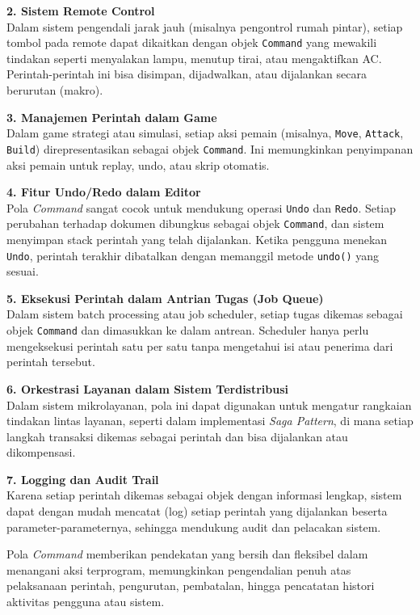 \textbf{2. Sistem Remote Control} \\
Dalam sistem pengendali jarak jauh (misalnya pengontrol rumah pintar), setiap tombol pada remote dapat dikaitkan dengan objek \texttt{Command} yang mewakili tindakan seperti menyalakan lampu, menutup tirai, atau mengaktifkan AC. Perintah-perintah ini bisa disimpan, dijadwalkan, atau dijalankan secara berurutan (makro).

\textbf{3. Manajemen Perintah dalam Game} \\
Dalam game strategi atau simulasi, setiap aksi pemain (misalnya, \texttt{Move}, \texttt{Attack}, \texttt{Build}) direpresentasikan sebagai objek \texttt{Command}. Ini memungkinkan penyimpanan aksi pemain untuk replay, undo, atau skrip otomatis.

\textbf{4. Fitur Undo/Redo dalam Editor} \\
Pola \textit{Command} sangat cocok untuk mendukung operasi \texttt{Undo} dan \texttt{Redo}. Setiap perubahan terhadap dokumen dibungkus sebagai objek \texttt{Command}, dan sistem menyimpan stack perintah yang telah dijalankan. Ketika pengguna menekan \texttt{Undo}, perintah terakhir dibatalkan dengan memanggil metode \texttt{undo()} yang sesuai.

\textbf{5. Eksekusi Perintah dalam Antrian Tugas (Job Queue)} \\
Dalam sistem batch processing atau job scheduler, setiap tugas dikemas sebagai objek \texttt{Command} dan dimasukkan ke dalam antrean. Scheduler hanya perlu mengeksekusi perintah satu per satu tanpa mengetahui isi atau penerima dari perintah tersebut.

\textbf{6. Orkestrasi Layanan dalam Sistem Terdistribusi} \\
Dalam sistem mikrolayanan, pola ini dapat digunakan untuk mengatur rangkaian tindakan lintas layanan, seperti dalam implementasi \textit{Saga Pattern}, di mana setiap langkah transaksi dikemas sebagai perintah dan bisa dijalankan atau dikompensasi.

\textbf{7. Logging dan Audit Trail} \\
Karena setiap perintah dikemas sebagai objek dengan informasi lengkap, sistem dapat dengan mudah mencatat (log) setiap perintah yang dijalankan beserta parameter-parameternya, sehingga mendukung audit dan pelacakan sistem.

Pola \textit{Command} memberikan pendekatan yang bersih dan fleksibel dalam menangani aksi terprogram, memungkinkan pengendalian penuh atas pelaksanaan perintah, pengurutan, pembatalan, hingga pencatatan histori aktivitas pengguna atau sistem.


